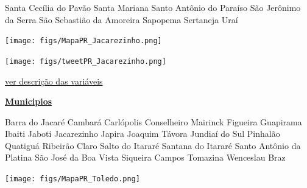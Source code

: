 \documentclass[10pt]{article} %
\begin{document}
\begin{minipage}[t]{.30\linewidth}
\begin{mdframed}[style=sidebar,frametitle={}]
\begin{itemize}
\gsquare Santa Cecília do Pavão 
\gsquare Santa Mariana 
\gsquare Santo Antônio do Paraíso 
\gsquare São Jerônimo da Serra 
\gsquare São Sebastião da Amoreira 
\gsquare Sapopema 
\gsquare Sertaneja 
\gsquare Uraí 
\end{itemize}\BackToContents\end{mdframed}\hfill\end{minipage}\newpage\begin{minipage}[t]{.66\linewidth}
\hypertarget{Jcrz}{}
\texttt{[image: figs/MapaPR\_Jacarezinho.png]}\vspace{0.5cm}\vspace{0.5cm}\begin{center}
\texttt{[image: figs/tweetPR\_Jacarezinho.png]}\end{center}
\begin{center}

\end{center}
\small{\hyperlink{vartab}{ver descrição das variáveis}}\end{minipage}\hfill\begin{minipage}[t]{.30\linewidth}
\begin{mdframed}[style=sidebar,frametitle={}]
\textbf{\hyperlink{municips}{Municipios}}\begin{itemize}\gsquare Barra do Jacaré 
\gsquare Cambará 
\gsquare Carlópolis 
\gsquare Conselheiro Mairinck 
\gsquare Figueira 
\gsquare Guapirama 
\gsquare Ibaiti 
\gsquare Jaboti 
\gsquare Jacarezinho 
\gsquare Japira 
\gsquare Joaquim Távora 
\gsquare Jundiaí do Sul 
\gsquare Pinhalão 
\gsquare Quatiguá 
\gsquare Ribeirão Claro 
\gsquare Salto do Itararé 
\gsquare Santana do Itararé 
\gsquare Santo Antônio da Platina 
\gsquare São José da Boa Vista 
\gsquare Siqueira Campos 
\gsquare Tomazina 
\gsquare Wenceslau Braz 
\end{itemize}\BackToContents\end{mdframed}\hfill\end{minipage}\newpage\begin{minipage}[t]{.66\linewidth}
\hypertarget{Told}{}
\texttt{[image: figs/MapaPR\_Toledo.png]}\vspace{0.5cm}\vspace{0.5cm}\begin{center}

\end{center}
\end{minipage}
\end{document}
